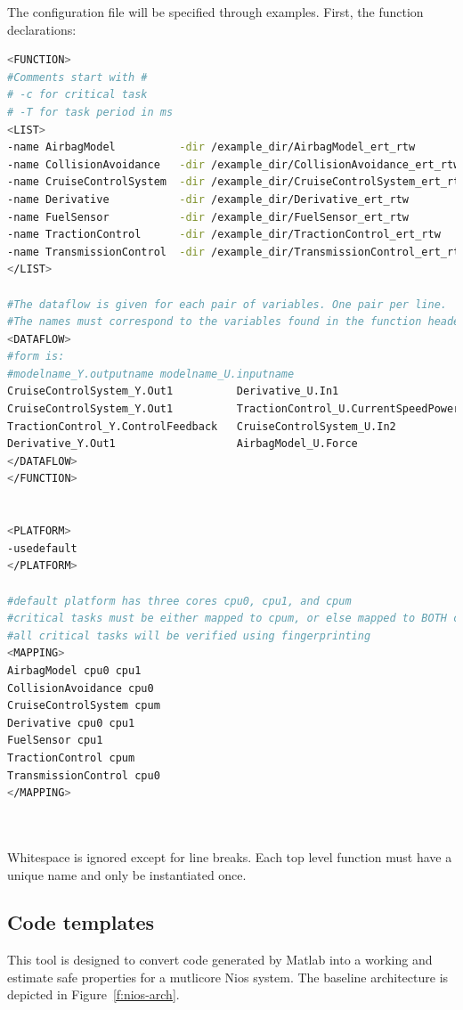 \documentclass[table,11pt]{article}
\begin{document}
The configuration file will be specified through examples. First, the function declarations:

\begin{lstlisting}[caption={Function configuration syntax},label=l:config-function,language=bash]
<FUNCTION>
#Comments start with #
# -c for critical task
# -T for task period in ms
<LIST>
-name AirbagModel          -dir /example_dir/AirbagModel_ert_rtw         -T  20 -c
-name CollisionAvoidance   -dir /example_dir/CollisionAvoidance_ert_rtw  -T 100
-name CruiseControlSystem  -dir /example_dir/CruiseControlSystem_ert_rtw -T  20 -c
-name Derivative           -dir /example_dir/Derivative_ert_rtw          -T  20 -c
-name FuelSensor           -dir /example_dir/FuelSensor_ert_rtw          -T 100
-name TractionControl      -dir /example_dir/TractionControl_ert_rtw     -T  20 -c
-name TransmissionControl  -dir /example_dir/TransmissionControl_ert_rtw -T 100 
</LIST>

#The dataflow is given for each pair of variables. One pair per line. 
#The names must correspond to the variables found in the function header file. 
<DATAFLOW>
#form is:
#modelname_Y.outputname modelname_U.inputname
CruiseControlSystem_Y.Out1          Derivative_U.In1
CruiseControlSystem_Y.Out1          TractionControl_U.CurrentSpeedPoweredAxle
TractionControl_Y.ControlFeedback   CruiseControlSystem_U.In2
Derivative_Y.Out1                   AirbagModel_U.Force
</DATAFLOW>
</FUNCTION>


<PLATFORM>
-usedefault
</PLATFORM>

#default platform has three cores cpu0, cpu1, and cpum
#critical tasks must be either mapped to cpum, or else mapped to BOTH cpu0 and cpu1
#all critical tasks will be verified using fingerprinting
<MAPPING>
AirbagModel cpu0 cpu1
CollisionAvoidance cpu0
CruiseControlSystem cpum
Derivative cpu0 cpu1
FuelSensor cpu1
TractionControl cpum
TransmissionControl cpu0
</MAPPING>

 
\end{lstlisting}


Whitespace is ignored except for line breaks. Each top level function must have a unique name and only be instantiated once.


\subsection{Code templates}

This tool is designed to convert code generated by Matlab into a working and estimate safe properties for a mutlicore Nios system. The baseline architecture is depicted in Figure~\ref{f:nios-arch}. 
\end{document}
